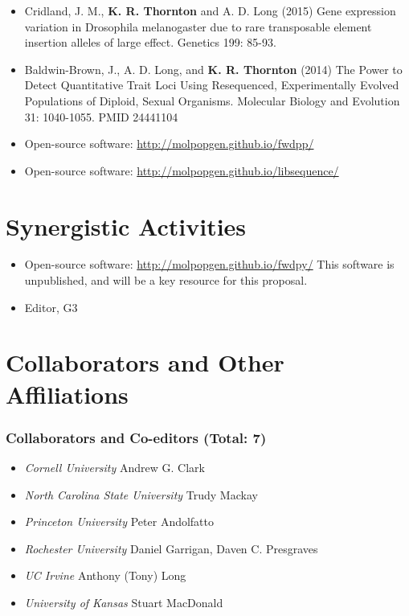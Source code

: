 \documentclass[10pt]{article}
\begin{document}
\begin{itemize} \setlength{\itemsep}{0pt} \setlength{\parskip}{2pt} \setlength{\parsep}{0pt}

\item Cridland, J. M., \textbf{K. R. Thornton} and A. D. Long (2015) Gene expression variation in Drosophila melanogaster due to rare transposable element insertion alleles of large effect. Genetics 199: 85-93.

\item Baldwin-Brown, J., A. D. Long, and \textbf{K. R. Thornton} (2014) The Power to Detect Quantitative Trait Loci Using Resequenced, Experimentally Evolved Populations of Diploid, Sexual Organisms. Molecular Biology and Evolution 31: 1040-1055. PMID 24441104

\item Open-source software: \url{http://molpopgen.github.io/fwdpp/}

\item Open-source software: \url{http://molpopgen.github.io/libsequence/}
\end{itemize}

\section{Synergistic Activities}

\begin{itemize} \setlength{\itemsep}{0pt} \setlength{\parskip}{2pt} \setlength{\parsep}{0pt}
\item Open-source software: \url{http://molpopgen.github.io/fwdpy/}  This software is unpublished, and will be a key resource for this proposal.
\item Editor, G3
\end{itemize}

\section{Collaborators and Other Affiliations}
\subsubsection*{Collaborators and Co-editors (Total: 7)}
\begin{itemize}
\item \emph{Cornell University} Andrew G. Clark
\item \emph{North Carolina State University} Trudy Mackay
\item \emph{Princeton University} Peter Andolfatto 
\item \emph{Rochester University} Daniel Garrigan, Daven C. Presgraves
\item \emph{UC Irvine} Anthony (Tony) Long 
\item \emph{University of Kansas} Stuart MacDonald
\end{itemize}
\end{document}
